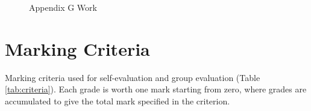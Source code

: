 \documentclass[11pt, a4, nocenter, margin=150mm]{article}
\begin{document}
\begin{appendices}
	\begin{figure}[h!]
		\centering
		\caption{Appendix G Work}
		\label{fig:report5}
	\end{figure}

\pagebreak

\section{Marking Criteria}
\label{app:marking_criteria}

	Marking criteria used for self-evaluation and group evaluation (Table \ref{tab:criteria}). Each grade is worth one mark starting from zero, where grades are accumulated to give the total mark specified in the criterion.


\end{appendices}
\end{document}

